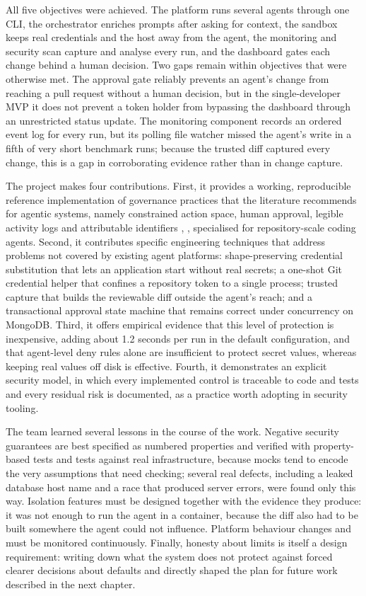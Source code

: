 \documentclass[12pt,a4paper,oneside]{report}
\begin{document}
All five objectives were achieved. The platform runs several agents through one CLI, the orchestrator enriches prompts after asking for context, the sandbox keeps real credentials and the host away from the agent, the monitoring and security scan capture and analyse every run, and the dashboard gates each change behind a human decision. Two gaps remain within objectives that were otherwise met. The approval gate reliably prevents an agent's change from reaching a pull request without a human decision, but in the single-developer MVP it does not prevent a token holder from bypassing the dashboard through an unrestricted status update. The monitoring component records an ordered event log for every run, but its polling file watcher missed the agent's write in a fifth of very short benchmark runs; because the trusted diff captured every change, this is a gap in corroborating evidence rather than in change capture.

The project makes four contributions. First, it provides a working, reproducible reference implementation of governance practices that the literature recommends for agentic systems, namely constrained action space, human approval, legible activity logs and attributable identifiers \cite{ref9}, \cite{ref10}, specialised for repository-scale coding agents. Second, it contributes specific engineering techniques that address problems not covered by existing agent platforms: shape-preserving credential substitution that lets an application start without real secrets; a one-shot Git credential helper that confines a repository token to a single process; trusted capture that builds the reviewable diff outside the agent's reach; and a transactional approval state machine that remains correct under concurrency on MongoDB. Third, it offers empirical evidence that this level of protection is inexpensive, adding about 1.2 seconds per run in the default configuration, and that agent-level deny rules alone are insufficient to protect secret values, whereas keeping real values off disk is effective. Fourth, it demonstrates an explicit security model, in which every implemented control is traceable to code and tests and every residual risk is documented, as a practice worth adopting in security tooling.

The team learned several lessons in the course of the work. Negative security guarantees are best specified as numbered properties and verified with property-based tests and tests against real infrastructure, because mocks tend to encode the very assumptions that need checking; several real defects, including a leaked database host name and a race that produced server errors, were found only this way. Isolation features must be designed together with the evidence they produce: it was not enough to run the agent in a container, because the diff also had to be built somewhere the agent could not influence. Platform behaviour changes and must be monitored continuously. Finally, honesty about limits is itself a design requirement: writing down what the system does not protect against forced clearer decisions about defaults and directly shaped the plan for future work described in the next chapter.
\end{document}
